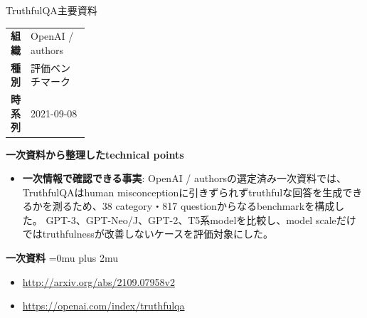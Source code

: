 \begin{technicalnote}{TruthfulQA}{主要資料}
\begingroup
\begin{tabularx}{\linewidth}{@{}>{\bfseries}p{0.22\linewidth}X@{}}
組織 & OpenAI / authors \\
種別 & 評価ベンチマーク \\
時系列 & 2021-09-08 \\
\end{tabularx}
\smallskip
{\bfseries 一次資料から整理したtechnical points}
\begin{itemize}[leftmargin=1.5em,itemsep=0.35em]
\item \textbf{一次情報で確認できる事実}: OpenAI / authorsの選定済み一次資料では、TruthfulQAはhuman misconceptionに引きずられずtruthfulな回答を生成できるかを測るため、38 category・817 questionからなるbenchmarkを構成した。 GPT-3、GPT-Neo/J、GPT-2、T5系modelを比較し、model scaleだけではtruthfulnessが改善しないケースを評価対象にした。
\end{itemize}
\begin{minipage}{\linewidth}
\begin{samepage}
{\bfseries 一次資料}
\begingroup\sloppy
\Urlmuskip=0mu plus 2mu\relax
\begin{itemize}[leftmargin=1.5em,itemsep=0.25em]
\item {\scriptsize\url{http://arxiv.org/abs/2109.07958v2}}
\item {\scriptsize\url{https://openai.com/index/truthfulqa}}
\end{itemize}
\endgroup
\end{samepage}
\end{minipage}
\endgroup
\end{technicalnote}
\medskip

